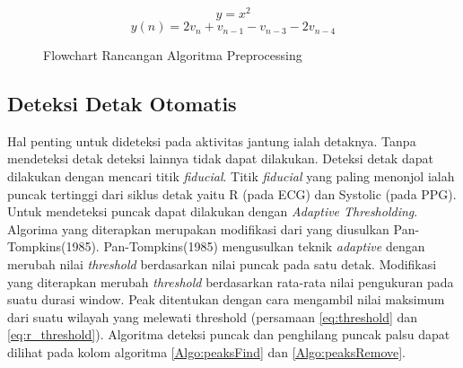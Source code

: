 \begin{equation}
y = x^{2}
\label{eq:square}
\end{equation}
\begin{equation}
y(n) = 2v_{n} + v_{n-1} - v_{n-3} - 2v_{n-4}
\label{eq:mwi}
\end{equation}

\begin{figure}[H]
	\centering
    \caption{Flowchart Rancangan Algoritma Preprocessing}
	\label{flow:fig_preproc_algorithm}
\end{figure}

\subsection{Deteksi Detak Otomatis}
Hal penting untuk dideteksi pada aktivitas jantung ialah detaknya. Tanpa mendeteksi detak deteksi lainnya tidak dapat dilakukan. Deteksi detak dapat dilakukan dengan mencari titik \textit{fiducial}. Titik \textit{fiducial} yang paling menonjol ialah puncak tertinggi dari siklus detak yaitu R (pada ECG) dan Systolic (pada PPG). Untuk mendeteksi puncak dapat dilakukan dengan \textit{Adaptive Thresholding}. Algorima yang diterapkan merupakan modifikasi dari yang diusulkan Pan-Tompkins(1985). Pan-Tompkins(1985) mengusulkan teknik \textit{adaptive} dengan merubah nilai \textit{threshold} berdasarkan nilai puncak pada satu detak. Modifikasi yang diterapkan merubah \textit{threshold} berdasarkan rata-rata nilai pengukuran pada suatu durasi window. Peak ditentukan dengan cara mengambil nilai maksimum dari suatu wilayah yang melewati threshold (persamaan \ref{eq:threshold} dan \ref{eq:r_threshold}). Algoritma deteksi puncak dan penghilang puncak palsu dapat dilihat pada kolom algoritma \ref{Algo:peaksFind} dan \ref{Algo:peaksRemove}.


